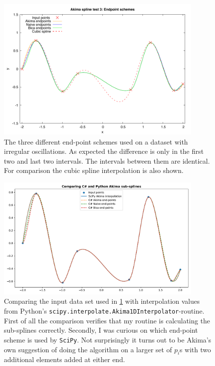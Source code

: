 \documentclass[a4paper]{article}
\begin{document}
\begin{figure}
    \centering
    \includegraphics[width=0.9\textwidth]{fig/akima_spline_endpoints.pdf}
    \caption{The three different end-point schemes used on a dataset with irregular oscillations. As expected the difference is only in the first two and last two intervals. The intervals between them are identical. For comparison the cubic spline interpolation is also shown. }
    \label{fig:4}
\end{figure}

\begin{figure}
    \centering
    \includegraphics[width=0.9\textwidth]{fig/scipy_comparison.pdf}
    \caption{Comparing the input data set used in \ref{fig:4} with interpolation values from Python's \texttt{scipy.interpolate.Akima1DInterpolator}-routine. First of all the comparison verifies that my routine is calculating the sub-splines correctly. Secondly, I was curious on which end-point scheme is used by \texttt{SciPy}. Not surprisingly it turns out to be Akima's own suggestion of doing the algorithm on a larger set of $p_i$s with two additional elements added at either end.}
    \label{fig:5}
\end{figure}
\end{document}
